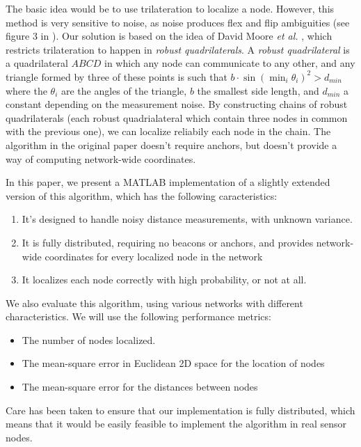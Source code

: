 \documentclass[letterpaper, 10 pt, conference]{ieeeconf}  %
\begin{document}
The basic idea would be to use trilateration to localize a node. However, this method is very sensitive to noise, as noise produces flex and flip ambiguities (see figure 3 in \cite{MooreTeller}). Our solution is based on the idea of David Moore \emph{et al.} \cite{MooreTeller}, which restricts trilateration to happen in \emph{robust quadrilaterals}. A \emph{robust quadrilateral} is a quadrilateral $ABCD$ in which any node can communicate to any other, and any triangle formed by three of these points is such that $b \cdot \sin(\min_i \theta_i)^2 > d_{min} $ where the $\theta_i$ are the angles of the triangle, $b$ the smallest side length, and $d_{min}$ a constant depending on the measurement noise. By constructing chains of robust quadrilaterals (each robust quadrialateral which contain three nodes in common with the previous one), we can localize reliabily each node in the chain. The algorithm in the original paper doesn't require anchors, but doesn't provide a way of computing network-wide coordinates.

In this paper, we present a MATLAB implementation of a slightly extended version of this algorithm, which has the following caracteristics:

\begin{enumerate}
    \item It's designed to handle noisy distance measurements, with unknown variance.
    \item It is fully distributed, requiring no beacons or anchors, and provides network-wide coordinates for every localized node in the network
    \item It localizes each node correctly with high probability, or not at all.
\end{enumerate}

We also evaluate this algorithm, using various networks with different characteristics. We will use the following performance metrics:

\begin{itemize}
    \item The number of nodes localized.
    \item The mean-square error in Euclidean 2D space for the location of nodes
    \item The mean-square error for the distances between nodes
\end{itemize}

Care has been taken to ensure that our implementation is fully distributed, which means that it would be easily feasible to implement the algorithm in real sensor nodes.
\end{document}
